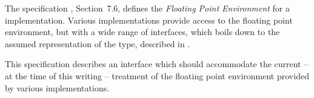 \documentclass[../Dictionary.tex]{subfiles}
\begin{document}
\label{sect:floating-point-env}

The \CLang{} specification \cite{2018:C18}, Section~7.6, defines the
\emph{Floating Point Environment} for a \CLang{} implementation.
Various \CL{} implementations provide access to the floating point
environment, but with a wide range of interfaces, which boils down to
the assumed representation of the \CLang{}  type,
described in \cite{2018:C18}.

This specification describes an interface which should accommodate the
current -- at the time of this writing -- treatment of the floating
point environment provided by various \CL{} implementations.







\end{document}
